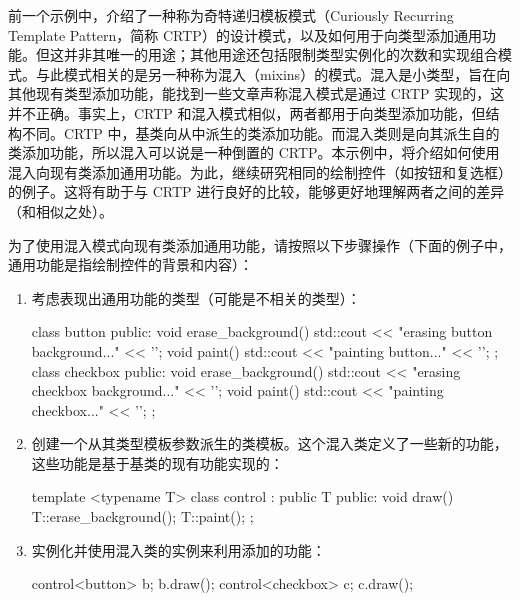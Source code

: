 
前一个示例中，介绍了一种称为奇特递归模板模式（Curiously Recurring Template Pattern，简称 CRTP）的设计模式，以及如何用于向类型添加通用功能。但这并非其唯一的用途；其他用途还包括限制类型实例化的次数和实现组合模式。与此模式相关的是另一种称为混入（mixins）的模式。混入是小类型，旨在向其他现有类型添加功能，能找到一些文章声称混入模式是通过 CRTP 实现的，这并不正确。事实上，CRTP 和混入模式相似，两者都用于向类型添加功能，但结构不同。CRTP 中，基类向从中派生的类添加功能。而混入类则是向其派生自的类添加功能，所以混入可以说是一种倒置的 CRTP。本示例中，将介绍如何使用混入向现有类添加通用功能。为此，继续研究相同的绘制控件（如按钮和复选框）的例子。这将有助于与 CRTP 进行良好的比较，能够更好地理解两者之间的差异（和相似之处）。


为了使用混入模式向现有类添加通用功能，请按照以下步骤操作（下面的例子中，通用功能是指绘制控件的背景和内容）：

\begin{enumerate}
\item
考虑表现出通用功能的类型（可能是不相关的类型）：

\begin{cpp}
class button
{
public:
    void erase_background()
    {
        std::cout << "erasing button background..." << '\n';
    }
    void paint()
    {
        std::cout << "painting button..." << '\n';
    }
};
class checkbox
{
public:
    void erase_background()
    {
        std::cout << "erasing checkbox background..." << '\n';
    }
    void paint()
    {
        std::cout << "painting checkbox..." << '\n';
    }
};
\end{cpp}

\item
创建一个从其类型模板参数派生的类模板。这个混入类定义了一些新的功能，这些功能是基于基类的现有功能实现的：

\begin{cpp}
template <typename T>
class control : public T
{
public:
    void draw()
    {
        T::erase_background();
        T::paint();
    }
};
\end{cpp}

\item
实例化并使用混入类的实例来利用添加的功能：

\begin{cpp}
control<button> b;
b.draw();
control<checkbox> c;
c.draw();
\end{cpp}
\end{enumerate}


